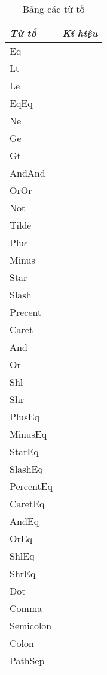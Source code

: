 \begin{longtable}{|p{4cm}| l |}
    \caption{Bảng các từ tố} \\
\hline
\textbf{\textit{Từ tố}} & \textbf{\textit{Kí hiệu}} \\
\hline
Eq & \kw{=} \\
\hline
Lt & \kw{<} \\
\hline
Le & \kw{<=} \\
\hline
EqEq & \kw{==} \\
\hline
Ne & \kw{!=} \\
\hline
Ge & \kw{>=} \\
\hline
Gt & \kw{>} \\
\hline
AndAnd & \kw{\&\&} \\
\hline
OrOr & \kw{$|\,|$} \\
\hline
Not & \kw{!} \\
\hline
Tilde & \kw{-} \\
\hline
Plus & \kw{+} \\
\hline
Minus & \kw{-} \\
\hline
Star & \kw{*} \\
\hline
Slash & \kw{/} \\
\hline
Precent & \kw{\%} \\
\hline
Caret & \kw{$\wedge$} \\
\hline
And & \kw{\&} \\
\hline
Or & \kw{|} \\
\hline
Shl & \kw{<}\kw{<} \\
\hline
Shr & \kw{>}\kw{>} \\
\hline
PlusEq & \kw{+=} \\
\hline
MinusEq & \kw{-=} \\
\hline
StarEq & \kw{*=} \\
\hline
SlashEq & \kw{/=} \\
\hline
PercentEq & \kw{\%=} \\
\hline
CaretEq & \kw{$\wedge$=} \\
\hline
AndEq & \kw{\&=} \\
\hline
OrEq & \kw{|=} \\
\hline
ShlEq & \kw{<}\kw{<=} \\
\hline
ShrEq & \kw{>}\kw{>=} \\
\hline
Dot & \kw{.} \\
\hline
Comma & \kw{,} \\
\hline
Semicolon & \kw{;} \\
\hline
Colon & \kw{:} \\
\hline
PathSep & \kw{::} \\

\end{longtable}
